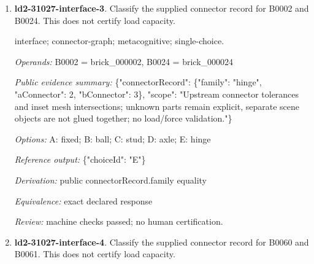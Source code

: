 \begin{enumerate}
\par{\small interface; connector-graph; metacognitive; single-choice.\par\textit{Operands:} B0027 = brick\_000027, B0026 = brick\_000026\par\textit{Public evidence summary:} \{"connectorRecord": \{"family": "fixed", "aConnector": 1, "bConnector": 1\}, "scope": "Upstream connector tolerances and inset mesh intersections; unknown parts remain explicit, separate scene objects are not glued together; no load/force validation."\}\par\textit{Options:} A: fixed; B: ball; C: stud; D: hinge; E: axle\par\textit{Reference output:} \{"choiceId": "A"\}\par\textit{Derivation:} public connectorRecord.family equality\par\textit{Equivalence:} exact declared response\par\textit{Review:} machine checks passed; no human certification.}
\item \textbf{ld2-31027-interface-3}. Classify the supplied connector record for B0002 and B0024. This does not certify load capacity.
\par{\small interface; connector-graph; metacognitive; single-choice.\par\textit{Operands:} B0002 = brick\_000002, B0024 = brick\_000024\par\textit{Public evidence summary:} \{"connectorRecord": \{"family": "hinge", "aConnector": 2, "bConnector": 3\}, "scope": "Upstream connector tolerances and inset mesh intersections; unknown parts remain explicit, separate scene objects are not glued together; no load/force validation."\}\par\textit{Options:} A: fixed; B: ball; C: stud; D: axle; E: hinge\par\textit{Reference output:} \{"choiceId": "E"\}\par\textit{Derivation:} public connectorRecord.family equality\par\textit{Equivalence:} exact declared response\par\textit{Review:} machine checks passed; no human certification.}
\item \textbf{ld2-31027-interface-4}. Classify the supplied connector record for B0060 and B0061. This does not certify load capacity.

\end{enumerate}
